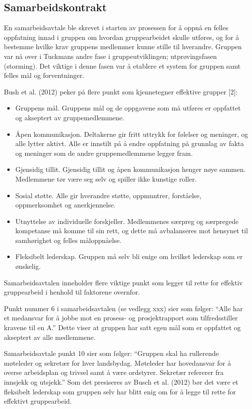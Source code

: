 \subsection{Samarbeidskontrakt}

En samarbeidsavtale ble skrevet i starten av prosessen for å oppnå en felles oppfatning innad i gruppen om hvordan gruppearbeidet skulle utføres, og for å bestemme hvilke krav gruppens medlemmer kunne stille til hverandre.
Gruppen var nå over i Tuckmans andre fase i gruppeutviklingen; utprøvingsfasen (storming). Det viktige i denne fasen var å etablere et system for gruppen samt felles mål og forventninger. 

Bush et al. (2012) peker på flere punkt som kjennetegner effektive grupper [2]:

\begin{itemize}
	\item Gruppens mål. Gruppens mål og de oppgavene som må utføres er oppfattet og akseptert av gruppemedlemmene.
	\item Åpen kommunikasjon. Deltakerne gir fritt uttrykk for følelser og meninger, og alle lytter aktivt. Alle er innstilt på å endre oppfatning på grunnlag av fakta og meninger som de andre gruppemedlemmene legger fram.
	\item Gjensidig tillit. Gjensidig tillit og åpen kommunikasjon henger nøye sammen. Medlemmene tør være seg selv og spiller ikke kunstige roller.
	\item Sosial støtte. Alle gir hverandre støtte, oppmuntrer, forståelse, oppmerksomhet og anerkjennelse.
	\item Utnyttelse av individuelle forskjeller. Medlemmenes særpreg og særpregede kompetanse må komme til sin rett, og dette må avbalanseres mot hensynet til samhørighet og felles måloppnåelse.
	\item Fleksibelt lederskap. Gruppen må selv bli enige om hvilket lederskap som er ønskelig.
\end{itemize}

Samarbeidsavtalen inneholder flere viktige punkt som legger til rette for effektiv gruppearbeid i henhold til faktorene overnfor. 

Punkt nummer 6 i samarbeidsavtalen (se vedlegg xxx) sier som følger:
“Alle har et medansvar for å jobbe mot en prosess- og prosjektrapport som tilfredsstiller kravene til en A.”
Dette viser at gruppen har satt egen mål som er oppfattet og akseptert av alle medlemmene.

Samarbeidsavtale punkt 10 sier som følger:
“Gruppen skal ha rullerende møteleder og sekretær for hver landsbydag.
Møteleder har hovedansvar for å overse arbeidsplan og trivsel samt å være ordstyrer.
Sekretær refererer fra innsjekk og utsjekk.”
Som det presiseres av Busch et al. (2012) bør det være et fleksibelt lederskap som gruppen selv har blitt enig om for å legge til rette for effektivt gruppearbeid.

